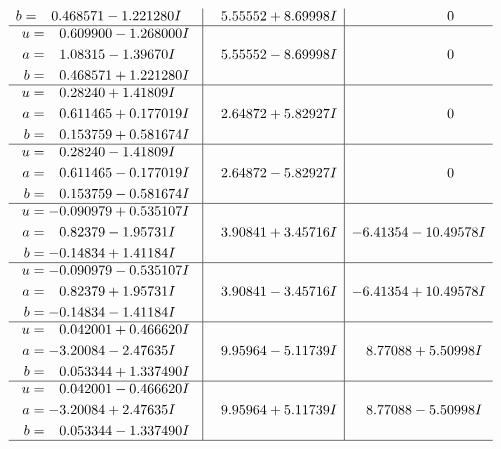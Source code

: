 \documentclass[1p]{elsarticle_modified}
\theoremstyle{definition}
\begin{document}
$$\begin{array}{c|c|c}
\begin{aligned}
b &= \phantom{-}0.468571 - 1.221280 I\end{aligned}
 & \phantom{-}5.55552 + 8.69998 I & \phantom{-0.000000 } 0 \\ \hline\begin{aligned}
u &= \phantom{-}0.609900 - 1.268000 I \\
a &= \phantom{-}1.08315 - 1.39670 I \\
b &= \phantom{-}0.468571 + 1.221280 I\end{aligned}
 & \phantom{-}5.55552 - 8.69998 I & \phantom{-0.000000 } 0 \\ \hline\begin{aligned}
u &= \phantom{-}0.28240 + 1.41809 I \\
a &= \phantom{-}0.611465 + 0.177019 I \\
b &= \phantom{-}0.153759 + 0.581674 I\end{aligned}
 & \phantom{-}2.64872 + 5.82927 I & \phantom{-0.000000 } 0 \\ \hline\begin{aligned}
u &= \phantom{-}0.28240 - 1.41809 I \\
a &= \phantom{-}0.611465 - 0.177019 I \\
b &= \phantom{-}0.153759 - 0.581674 I\end{aligned}
 & \phantom{-}2.64872 - 5.82927 I & \phantom{-0.000000 } 0 \\ \hline\begin{aligned}
u &= -0.090979 + 0.535107 I \\
a &= \phantom{-}0.82379 - 1.95731 I \\
b &= -0.14834 + 1.41184 I\end{aligned}
 & \phantom{-}3.90841 + 3.45716 I & -6.41354 - 10.49578 I \\ \hline\begin{aligned}
u &= -0.090979 - 0.535107 I \\
a &= \phantom{-}0.82379 + 1.95731 I \\
b &= -0.14834 - 1.41184 I\end{aligned}
 & \phantom{-}3.90841 - 3.45716 I & -6.41354 + 10.49578 I \\ \hline\begin{aligned}
u &= \phantom{-}0.042001 + 0.466620 I \\
a &= -3.20084 - 2.47635 I \\
b &= \phantom{-}0.053344 + 1.337490 I\end{aligned}
 & \phantom{-}9.95964 - 5.11739 I & \phantom{-}8.77088 + 5.50998 I \\ \hline\begin{aligned}
u &= \phantom{-}0.042001 - 0.466620 I \\
a &= -3.20084 + 2.47635 I \\
b &= \phantom{-}0.053344 - 1.337490 I\end{aligned}
 & \phantom{-}9.95964 + 5.11739 I & \phantom{-}8.77088 - 5.50998 I\\
 \hline 
 \end{array}$$\newpage
\end{document}
